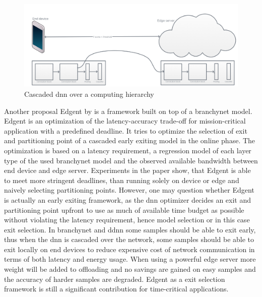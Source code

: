 \begin{figure}
	\centering
	\includegraphics[width=\linewidth]{figures/models/cascaded}
	\caption[Cascaded \gls{dnn} over a computing hierarchy]{Cascaded \gls{dnn} over a computing hierarchy}
\end{figure}

Another proposal Edgent \cite{li_edge_2018} by \citeauthor{li_edge_2018} is a framework built on top of a \gls{branchynet} model. Edgent is an optimization of the latency-accuracy trade-off for mission-critical application with a predefined deadline. It tries to optimize the selection of exit and partitioning point of a cascaded early exiting model in the online phase. The optimization is based on a latency requirement, a regression model of each layer type of the used \gls{branchynet} model and the observed available bandwidth between end device and edge server. Experiments in the paper show, that Edgent is able to meet more stringent deadlines, than running solely on device or edge and naively selecting partitioning points. However, one may question whether Edgent is actually an early exiting framework, as the \gls{dnn} optimizer decides an exit and partitioning point upfront to use as much of available time budget as possible without violating the latency requirement, hence model selection or in this case exit selection. In \gls{branchynet} and \gls{ddnn} some samples should be able to exit early, thus when the \gls{dnn} is cascaded over the network, some samples should be able to exit locally on end devices to reduce expensive cost of network communication in terms of both latency and energy usage. When using a powerful edge server more weight will be added to offloading and no savings are gained on easy samples and the accuracy of harder samples are degraded. Edgent as a exit selection framework is still a significant contribution for time-critical applications.

